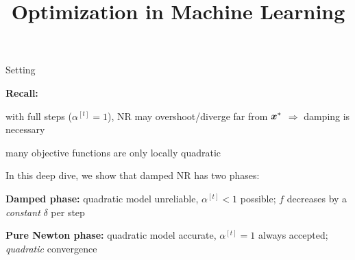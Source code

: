 \documentclass[11pt,compress,t,notes=noshow, xcolor=table]{beamer}
\title{Optimization in Machine Learning}
\begin{document}

\begin{framei}{Setting}
\item \textbf{Recall:}
\begin{itemizeM}
\item with full steps ($\alpha^{[t]} = 1$), NR may overshoot/diverge far from
$\bm{x}^\ast$ $\Rightarrow$ damping is necessary
\item many objective functions are only locally quadratic
\end{itemizeM}
\item In this deep dive, we show that damped NR has two phases:
\begin{itemizeM}
\item \textbf{Damped phase:} quadratic model unreliable, $\alpha^{[t]} < 1$ possible; $f$ decreases by a
\textit{constant} $\delta$ per step
\item \textbf{Pure Newton phase:} quadratic model accurate, $\alpha^{[t]} = 1$ always accepted; \textit{quadratic} convergence
\end{itemizeM}
\end{framei}
\end{document}
